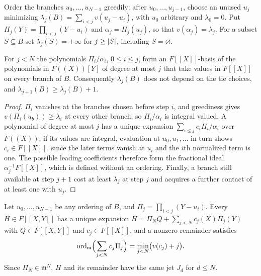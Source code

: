 \begin{definition}\label{lub:def:greedy}
Order the branches $u_0,\dots,u_{N-1}$ greedily: after $u_0,\dots,u_{j-1}$, choose an
unused $u_j$ minimizing $\lambda_j(B)=\sum_{i<j}v(u_j-u_i)$, with $u_0$ arbitrary and
$\lambda_0=0$. Put $\Pi_j(Y)=\prod_{i<j}(Y-u_i)$ and $\alpha_j=\Pi_j(u_j)$, so that
$v(\alpha_j)=\lambda_j$. For a subset $S\subseteq B$ set $\lambda_j(S)=+\infty$ for
$j\ge\lvert S\rvert$, including $S=\varnothing$.
\end{definition}

\begin{lemma}\label{lub:lem:newton}
For $j<N$ the polynomials $\Pi_i/\alpha_i$, $0\le i\le j$, form an $F[[X]]$-basis of the
polynomials in $F((X))[Y]$ of degree at most $j$ that take values in $F[[X]]$ on every
branch of $B$. Consequently $\lambda_j(B)$ does not depend on the tie choices, and
$\lambda_{j+1}(B)\ge\lambda_j(B)+1$.
\end{lemma}

\begin{proof}
$\Pi_i$ vanishes at the branches chosen before step $i$, and greediness gives
$v(\Pi_i(u_b))\ge\lambda_i$ at every other branch; so $\Pi_i/\alpha_i$ is integral valued.
A polynomial of degree at most $j$ has a unique expansion $\sum_{i\le j}c_i\Pi_i/\alpha_i$
over $F((X))$; if its values are integral, evaluation at $u_0,u_1,\dots$ in turn shows
$c_i\in F[[X]]$, since the later terms vanish at $u_i$ and the $i$th normalized term is one.
The possible leading coefficients therefore form the fractional ideal $\alpha_j^{-1}F[[X]]$,
which is defined without an ordering. Finally, a branch still available at step $j+1$ cost
at least $\lambda_j$ at step $j$ and acquires a further contact of at least one with $u_j$.
\end{proof}

\begin{lemma}\label{lub:lem:division}
Let $u_0,\dots,u_{N-1}$ be any ordering of $B$, and $\Pi_j=\prod_{i<j}(Y-u_i)$. Every
$H\in F[[X,Y]]$ has a unique expansion $H=\Pi_NQ+\sum_{j<N}c_j(X)\Pi_j(Y)$ with $Q\in F[[X,Y]]$
and $c_j\in F[[X]]$, and a nonzero remainder satisfies
\[
 \operatorname{ord}_{\mathfrak m}\Bigl(\sum_{j<N}c_j\Pi_j\Bigr)=\min_{j<N}\bigl(v(c_j)+j\bigr).
\]
Since $\Pi_N\in\mathfrak m^N$, $H$ and its remainder have the same jet $J_d$ for $d\le N$.
\end{lemma}

